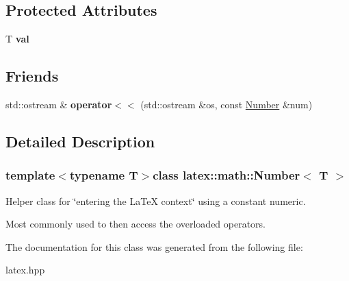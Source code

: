 \subsection*{\-Protected \-Attributes}
\begin{DoxyCompactItemize}
\item 
\hypertarget{classlatex_1_1math_1_1Number_a7a761cdf214f2d5752808ddaf651d2b7}{\-T {\bfseries val}}\label{classlatex_1_1math_1_1Number_a7a761cdf214f2d5752808ddaf651d2b7}

\end{DoxyCompactItemize}
\subsection*{\-Friends}
\begin{DoxyCompactItemize}
\item 
\hypertarget{classlatex_1_1math_1_1Number_aa6d72faef992d5b025e38cfbaad05ee4}{std\-::ostream \& {\bfseries operator$<$$<$} (std\-::ostream \&os, const \hyperlink{classlatex_1_1math_1_1Number}{\-Number} \&num)}\label{classlatex_1_1math_1_1Number_aa6d72faef992d5b025e38cfbaad05ee4}

\end{DoxyCompactItemize}


\subsection{\-Detailed \-Description}
\subsubsection*{template$<$typename T$>$class latex\-::math\-::\-Number$<$ T $>$}

\-Helper class for \char`\"{}entering the La\-Te\-X context\char`\"{} using a constant numeric.

\-Most commonly used to then access the overloaded operators. 

\-The documentation for this class was generated from the following file\-:\begin{DoxyCompactItemize}
\item 
latex.\-hpp\end{DoxyCompactItemize}
